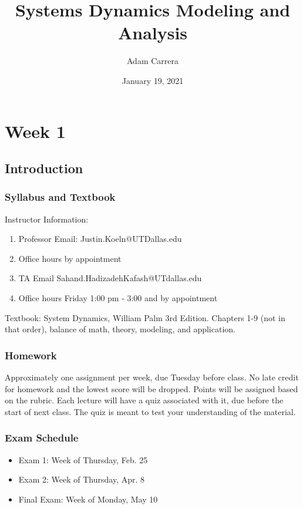 \documentclass[12pt, a4paper]{report}
\title{Systems Dynamics Modeling and Analysis}
\author{Adam Carrera}
\date{January 19, 2021}
\begin{document}
  \maketitle
  \part{Week 1}
  \chapter{Introduction}

  \section{Syllabus and Textbook}

  Instructor Information:
  \begin{enumerate}
    \item Professor Email: Justin.Koeln@UTDallas.edu
    \item Office hours by appointment
    \item TA Email Sahand.HadizadehKafash@UTdallas.edu
    \item Office hours Friday 1:00 pm - 3:00 and by appointment
  \end{enumerate}

  \noindent
  Textbook: System Dynamics, William Palm 3rd Edition. Chapters 1-9 (not in that order), balance of math, theory, modeling, and application.

  \section{Homework}

  Approximately one assignment per week, due Tuesday before class. No late credit for homework and the lowest score will be dropped. Points will be assigned based on the rubric. Each lecture will have a quiz associated with it, due before the start of next class. The quiz is meant to test your understanding of the material.

  \section{Exam Schedule}

  \begin{itemize}
    \item Exam 1: Week of Thursday, Feb. 25
    \item Exam 2: Week of Thursday, Apr. 8
    \item Final Exam: Week of Monday, May 10
  \end{itemize}
\end{document}

